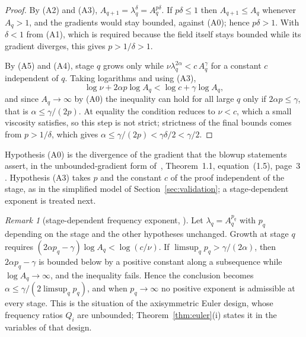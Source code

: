\documentclass[11pt]{article}
\theoremstyle{remark}
\newtheorem{remark}[theorem]{Remark}
\newcommand{\ev}[1]{\hspace{0.2em}{\small\textsf{[#1]}}}
\begin{document}
\begin{proof}
By (A2) and (A3), $A_{q+1}=\lambda_{q}^{\delta}=A_{q}^{p\delta}$. If $p\delta\le1$ then
$A_{q+1}\le A_{q}$ whenever $A_{q}>1$, and the gradients would stay bounded, against (A0); hence
$p\delta>1$. With $\delta<1$ from (A1), which is required because the field itself stays bounded
while its gradient diverges, this gives $p>1/\delta>1$.

By (A5) and (A4), stage $q$ grows only while $\nu\lambda_{q}^{2\alpha}<c\,A_{q}^{\gamma}$ for a
constant $c$ independent of $q$. Taking logarithms and using (A3),
\[
\log\nu+2\alpha p\log A_{q}<\log c+\gamma\log A_{q},
\]
and since $A_{q}\to\infty$ by (A0) the inequality can hold for all large $q$ only if
$2\alpha p\le\gamma$, that is $\alpha\le\gamma/(2p)$. At equality the condition reduces to $\nu<c$,
which a small viscosity satisfies, so this step is not strict; strictness of the final bounds comes
from $p>1/\delta$, which gives $\alpha\le\gamma/(2p)<\gamma\delta/2<\gamma/2$.
\end{proof}

Hypothesis (A0) is the divergence of the gradient that the blowup statements assert, in the
unbounded-gradient form of~\cite{ab-boussinesq}, Theorem~1.1, equation~(1.5), page~3 \ev{V}.
Hypothesis (A3) takes $p$ and the constant $c$ of the proof independent of the stage, as in the
simplified model of Section~\ref{sec:validation}; a stage-dependent exponent is treated next.

\begin{remark}[stage-dependent frequency exponent, \ev{D}]\label{rem:pq}
Let $\lambda_{q}=A_{q}^{p_{q}}$ with $p_{q}$ depending on the stage and the other hypotheses
unchanged. Growth at stage $q$ requires $(2\alpha p_{q}-\gamma)\log A_{q}<\log(c/\nu)$. If
$\limsup_{q}p_{q}>\gamma/(2\alpha)$, then $2\alpha p_{q}-\gamma$ is bounded below by a positive
constant along a subsequence while $\log A_{q}\to\infty$, and the inequality fails. Hence the
conclusion becomes $\alpha\le\gamma/(2\limsup_{q}p_{q})$, and when $p_{q}\to\infty$ no positive
exponent is admissible at every stage. This is the situation of the axisymmetric Euler design, whose
frequency ratios $Q_{i}$ are unbounded; Theorem~\ref{thm:euler}(i) states it in the variables of that
design.
\end{remark}
\end{document}
